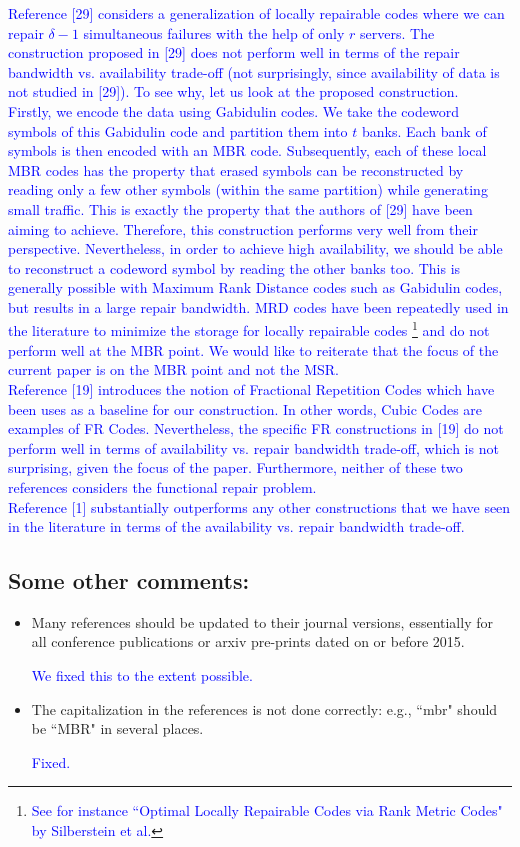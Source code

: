 \documentclass{article}
\begin{document}
\begin{itemize}
\textcolor{blue}{Reference [29] considers a generalization of locally repairable codes where we can repair $\delta - 1$ simultaneous failures with the help of only $r$ servers. The construction proposed in [29] does not perform well in terms of the repair bandwidth vs. availability trade-off (not surprisingly, since availability of data is not studied in [29]). To see why, let us look at the proposed construction.\\
Firstly, we encode the data using Gabidulin codes. We take the codeword symbols of this Gabidulin code and partition them into $t$ banks. Each bank of symbols is then encoded with an MBR code. Subsequently, each of these local MBR codes has the property that erased symbols can be reconstructed by reading only a few other symbols (within the same partition) while generating small traffic. This is exactly the property that the authors of [29] have been aiming to achieve. Therefore, this construction performs very well from their perspective. Nevertheless, in order to achieve high availability, we should be able to reconstruct a codeword symbol by reading the other banks too. This is generally possible with Maximum Rank Distance codes such as Gabidulin codes, but results in a large repair bandwidth. MRD codes have been repeatedly used in the literature to minimize the storage for locally repairable codes \footnote{\textcolor{blue}{See for instance ``Optimal Locally Repairable Codes via Rank Metric Codes" by Silberstein et al.}} and do not perform well at the MBR point. We would like to reiterate that the focus of the current paper is on the MBR point and not the MSR.\\
Reference [19] introduces the notion of Fractional Repetition Codes which have been uses as a baseline for our construction. In other words, Cubic Codes are examples of FR Codes. Nevertheless, the specific FR constructions in [19] do not perform well in terms of availability vs. repair bandwidth trade-off, which is not surprising, given the focus of the paper. Furthermore, neither of these two references considers the functional repair problem.\\
Reference [1] substantially outperforms any other constructions that we have seen in the literature in terms of the availability vs. repair bandwidth trade-off.   }
\end{itemize}

\subsection*{Some other comments:}
\begin{itemize}
\item Many references should be updated to their journal versions, essentially for all conference publications or arxiv pre-prints dated on or before 2015.

\textcolor{blue}{We fixed this to the extent possible.}

\item The capitalization in the references is not done correctly: e.g., ``mbr" should be ``MBR" in several places.

\textcolor{blue}{Fixed.}

\end{itemize}
\end{document}
